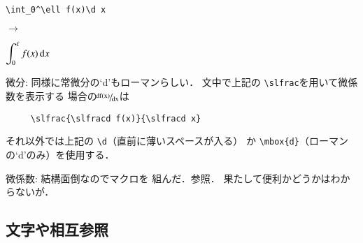 \documentclass[onecolumn]{jsce}  %
\begin{document}
\begin{Description}
\noindent
\mbox{}\hfill
\begin{minipage}[c]{.3\textwidth}
\renewcommand{\baselinestretch}{0.75}\small\normalsize
\begin{verbatim}
\int_0^\ell f(x)\d x
\end{verbatim}
\renewcommand{\baselinestretch}{1}\small\normalsize
\end{minipage}
\hfill$\to$\hfill
\begin{minipage}[c]{.3\textwidth}
$\displaystyle\int_0^\ell f(x)\,\mbox{d} x$
\end{minipage}
\hfill\mbox{}
\medskip
%
\item[微分:] 同様に常微分の`d'もローマンらしい．
文中で上記の \verb+\slfrac+を用いて微係数を表示する
場合の$\slfrac{\slfracd f(x)}{\slfracd x}$は
\begin{verbatim}
     \slfrac{\slfracd f(x)}{\slfracd x}
\end{verbatim}
それ以外では上記の \verb+\d+（直前に薄いスペースが入る）
か \verb+\mbox{d}+（ローマンの`d'のみ）を使用する．
%
\item[微係数:] 結構面倒なのでマクロを
組んだ．\tabno{\ref{tab:derivative}}参照．
果たして便利かどうかはわからないが．
\end{Description}

\subsection{文字や相互参照}
\label{sec:koko}
\end{document}
